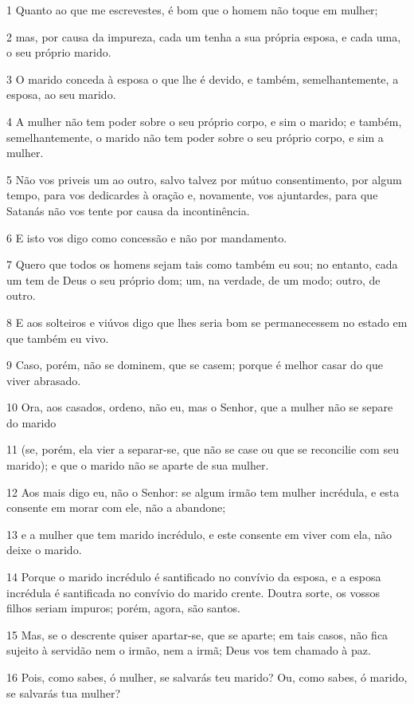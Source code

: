 \par 1 Quanto ao que me escrevestes, é bom que o homem não toque em mulher;
\par 2 mas, por causa da impureza, cada um tenha a sua própria esposa, e cada uma, o seu próprio marido.
\par 3 O marido conceda à esposa o que lhe é devido, e também, semelhantemente, a esposa, ao seu marido.
\par 4 A mulher não tem poder sobre o seu próprio corpo, e sim o marido; e também, semelhantemente, o marido não tem poder sobre o seu próprio corpo, e sim a mulher.
\par 5 Não vos priveis um ao outro, salvo talvez por mútuo consentimento, por algum tempo, para vos dedicardes à oração e, novamente, vos ajuntardes, para que Satanás não vos tente por causa da incontinência.
\par 6 E isto vos digo como concessão e não por mandamento.
\par 7 Quero que todos os homens sejam tais como também eu sou; no entanto, cada um tem de Deus o seu próprio dom; um, na verdade, de um modo; outro, de outro.
\par 8 E aos solteiros e viúvos digo que lhes seria bom se permanecessem no estado em que também eu vivo.
\par 9 Caso, porém, não se dominem, que se casem; porque é melhor casar do que viver abrasado.
\par 10 Ora, aos casados, ordeno, não eu, mas o Senhor, que a mulher não se separe do marido
\par 11 (se, porém, ela vier a separar-se, que não se case ou que se reconcilie com seu marido); e que o marido não se aparte de sua mulher.
\par 12 Aos mais digo eu, não o Senhor: se algum irmão tem mulher incrédula, e esta consente em morar com ele, não a abandone;
\par 13 e a mulher que tem marido incrédulo, e este consente em viver com ela, não deixe o marido.
\par 14 Porque o marido incrédulo é santificado no convívio da esposa, e a esposa incrédula é santificada no convívio do marido crente. Doutra sorte, os vossos filhos seriam impuros; porém, agora, são santos.
\par 15 Mas, se o descrente quiser apartar-se, que se aparte; em tais casos, não fica sujeito à servidão nem o irmão, nem a irmã; Deus vos tem chamado à paz.
\par 16 Pois, como sabes, ó mulher, se salvarás teu marido? Ou, como sabes, ó marido, se salvarás tua mulher?
